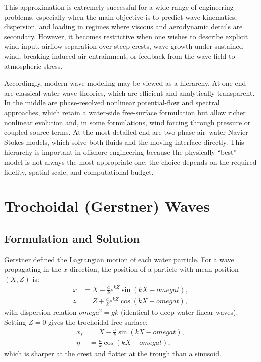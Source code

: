 \documentclass[journal,10pt,twocolumn]{IEEEtran}
\def\omega{omega}%
\begin{document}
This approximation is extremely successful for a wide range of engineering problems,
especially when the main objective is to predict wave kinematics, dispersion, and loading
in regimes where viscous and aerodynamic details are secondary.
However, it becomes restrictive when one wishes to describe explicit wind input, airflow
separation over steep crests, wave growth under sustained wind, breaking-induced air
entrainment, or feedback from the wave field to atmospheric stress.

Accordingly, modern wave modeling may be viewed as a hierarchy.
At one end are classical water-wave theories, which are efficient and analytically
transparent.
In the middle are phase-resolved nonlinear potential-flow and spectral approaches, which
retain a water-side free-surface formulation but allow richer nonlinear evolution and, in
some formulations, wind forcing through pressure or coupled source terms.
At the most detailed end are two-phase air--water Navier--Stokes models, which solve
both fluids and the moving interface directly.
This hierarchy is important in offshore engineering because the physically ``best'' model
is not always the most appropriate one; the choice depends on the required fidelity,
spatial scale, and computational budget.

\section{Trochoidal (Gerstner) Waves}
\label{sec:gerstner}

\subsection{Formulation and Solution}
Gerstner defined the Lagrangian motion of each water particle.
For a wave propagating in the $x$-direction, the position of a particle with mean
position $(X,Z)$ is:
\begin{align}
  x &= X - \frac{a}{k}e^{kZ}\sin(kX-\omega t), \\
  z &= Z + \frac{a}{k}e^{kZ}\cos(kX-\omega t),
\end{align}
with dispersion relation $\omega^2 = gk$ (identical to deep-water linear waves).
Setting $Z=0$ gives the trochoidal free surface:
\begin{align}
  x_s &= X - \frac{a}{k}\sin(kX-\omega t), \\
  \eta &= \frac{a}{k}\cos(kX-\omega t),
\end{align}
which is sharper at the crest and flatter at the trough than a sinusoid.
\end{document}
